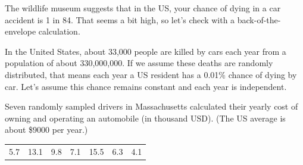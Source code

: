 \documentclass[12pt,letterpaper,addpoints]{exam}
\begin{document}
\begin{questions}
\newpage

\question[10] The wildlife museum suggests that in the US, your chance of dying in a car accident is 1 in 84. That seems a bit high, so let's check with a back-of-the-envelope calculation.

In the United States, about 33,000 people are killed by cars each year from a population of about 330,000,000. If we assume these deaths are randomly distributed, that means each year a US resident has a 0.01\% chance of dying by car. Let's assume this chance remains constant and each year is independent.

\newpage

\question[10] Seven randomly sampled drivers in Massachusetts calculated their yearly cost of owning and operating an automobile (in thousand USD). (The US average is about \$9000 per year.)
\begin{center}
\begin{tabular}{c c c c c c c}
5.7 & 13.1 & 9.8 & 7.1 &  15.5 & 6.3 & 4.1
\end{tabular}
\end{center}


\end{questions}
\end{document}
